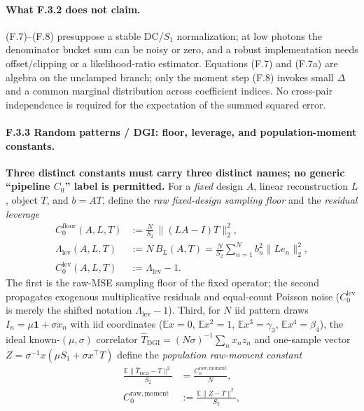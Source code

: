 \paragraph{What F.3.2 does not claim.} (F.7)--(F.8) presuppose a stable DC/$S_1$ normalization; at low photons the denominator bucket sum can be noisy or zero, and a robust implementation needs offset/clipping or a likelihood-ratio estimator. Equations (F.7) and (F.7a) are algebra on the unclamped branch; only the moment step (F.8) invokes small $\Delta$ and a common marginal distribution across coefficient indices. No cross-pair independence is required for the expectation of the summed squared error.

\paragraph{F.3.3 Random patterns / DGI: floor, leverage, and population-moment constants.} \textbf{Three distinct constants must carry three distinct names; no generic ``pipeline $C_0$'' label is permitted.} For a \emph{fixed} design $A$, linear reconstruction $L$, object $T$, and $b=AT$, define the \emph{raw fixed-design sampling floor} and the \emph{residual leverage}
\begin{align}
C_0^{\mathrm{floor}}(A,L,T)&:=\frac{N}{S_2}\,\|(LA-I)T\|_2^2, \tag{F.9a}\\
\Lambda_{\mathrm{lev}}(A,L,T)&:=N\,B_L(A,T)=\frac{N}{S_2}\sum_{n=1}^Nb_n^2\|Le_n\|_2^2, \tag{F.9b}\\
C_0^{\mathrm{lev}}(A,L,T)&:=\Lambda_{\mathrm{lev}}-1. \tag{F.9c}
\end{align}
The first is the raw-MSE sampling floor of the fixed operator; the second propagates exogenous multiplicative residuals and equal-count Poisson noise ($C_0^{\mathrm{lev}}$ is merely the shifted notation $\Lambda_{\mathrm{lev}}-1$). Third, for $N$ iid pattern draws $I_n=\mu\mathbf 1+\sigma x_n$ with iid coordinates ($\mathbb{E}x=0$, $\mathbb{E}x^2=1$, $\mathbb{E}x^3=\gamma_3$, $\mathbb{E}x^4=\beta_4$), the ideal known-$(\mu,\sigma)$ correlator $\hat T_{\mathrm{DGI}}=(N\sigma)^{-1}\sum_nx_nz_n$ and one-sample vector $Z=\sigma^{-1}x(\mu S_1+\sigma x^\top T)$ define the \emph{population raw-moment constant}
\begin{equation}
\begin{aligned}
\frac{\mathbb{E}\|\hat T_{\mathrm{DGI}}-T\|^2}{S_2}&=\frac{C_0^{\mathrm{raw,moment}}}{N},\\
C_0^{\mathrm{raw,moment}}&:=\frac{\mathbb{E}\|Z-T\|^2}{S_2},
\end{aligned}
\tag{F.9}
\end{equation}
